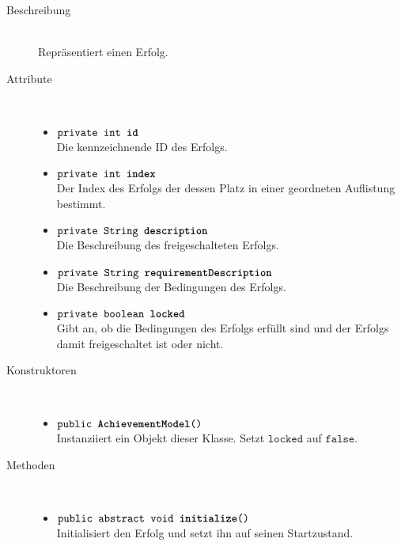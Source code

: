 \begin{description}
\item[Beschreibung] \hfill \\ Repräsentiert einen Erfolg.
\item[Attribute] \hfill \\
	\vspace{-.8cm}
	\begin{itemize}
		\item $\texttt{private int \textbf{id}}$ \\ Die kennzeichnende ID des Erfolgs.
		\item $\texttt{private int \textbf{index}}$ \\ Der Index des Erfolgs der dessen Platz in einer geordneten Auflistung bestimmt.
		\item $\texttt{private String \textbf{description}}$ \\ Die Beschreibung des freigeschalteten Erfolgs.
		\item $\texttt{private String \textbf{requirementDescription}}$ \\ Die Beschreibung der Bedingungen des Erfolgs.
		\item $\texttt{private boolean \textbf{locked}}$ \\ Gibt an, ob die Bedingungen des Erfolgs erfüllt sind und der Erfolgs damit freigeschaltet ist oder nicht.
	\end{itemize}
	
\item[Konstruktoren] \hfill \\
	\vspace{-.8cm}
	\begin{itemize}
		\item $\texttt{public \textbf{AchievementModel}()}$ \\ Instanziiert ein Objekt dieser Klasse. Setzt $\texttt{locked}$ auf $\texttt{false}$.
	\end{itemize}
	
\item[Methoden] \hfill \\
	\vspace{-.8cm}
	\begin{itemize}
		\item $\texttt{public abstract void \textbf{initialize}()}$ \\ Initialisiert den Erfolg und setzt ihn auf seinen Startzustand.
		

\end{itemize}
\end{description}
